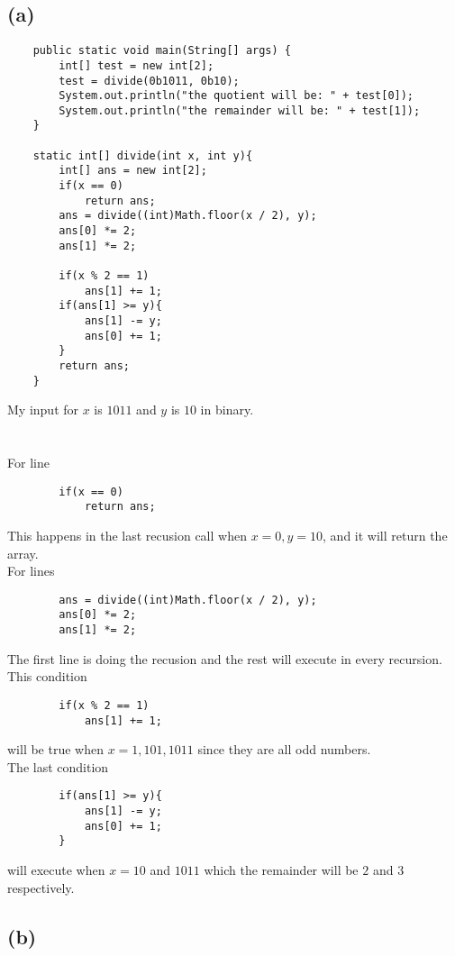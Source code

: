 \documentclass{article}
\begin{document}
    \subsection{(a)}
    \begin{verbatim}
    public static void main(String[] args) {
        int[] test = new int[2];
        test = divide(0b1011, 0b10);
        System.out.println("the quotient will be: " + test[0]);
        System.out.println("the remainder will be: " + test[1]);
    }

    static int[] divide(int x, int y){
        int[] ans = new int[2];
        if(x == 0)
            return ans;
        ans = divide((int)Math.floor(x / 2), y);
        ans[0] *= 2;
        ans[1] *= 2;

        if(x % 2 == 1)
            ans[1] += 1;
        if(ans[1] >= y){
            ans[1] -= y;
            ans[0] += 1;
        }
        return ans;
    }
    \end{verbatim}
    My input for $x$ is $1011$ and $y$ is $10$ in binary.\\\\\\
    For line
    \begin{verbatim}
        if(x == 0)
            return ans;
    \end{verbatim}
    This happens in the last recusion call when $x = 0, y = 10$, and it will return the array.\\
    For lines
    \begin{verbatim}
        ans = divide((int)Math.floor(x / 2), y);
        ans[0] *= 2;
        ans[1] *= 2;
    \end{verbatim}
    The first line is doing the recusion and the rest will execute in every recursion.
    This condition
    \begin{verbatim}
        if(x % 2 == 1)
            ans[1] += 1;
    \end{verbatim}
    will be true when $x = 1, 101, 1011$ since they are all odd numbers.\\
    The last condition
    \begin{verbatim}
        if(ans[1] >= y){
            ans[1] -= y;
            ans[0] += 1;
        }
    \end{verbatim}
    will execute when $x = 10$ and $1011$ which the remainder will be $2$ and $3$ respectively.

    \subsection{(b)}
\end{document}
